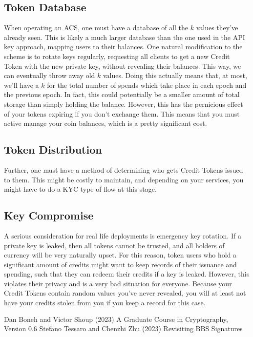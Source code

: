 \documentclass{article}
\begin{document}
\subsection*{Token Database}

When operating an ACS, one must have a database of all the $k$ values they've
already seen. This is likely a much larger database than the one used in the
API key approach, mapping users to their balances. One natural modification to
the scheme is to rotate keys regularly, requesting all clients to get a new
Credit Token with the new private key, without revealing their balances. This
way, we can eventually throw away old $k$ values. Doing this actually means
that, at most, we'll have a $k$ for the total number of spends which take place
in each epoch and the previous epoch. In fact, this could potentially be a
smaller amount of total storage than simply holding the balance. However, this
has the pernicious effect of your tokens expiring if you don't exchange them.
This means that you must active manage your coin balances, which is a pretty
significant cost.

\subsection*{Token Distribution}

Further, one must have a method of determining who gets Credit Tokens issued to
them. This might be costly to maintain, and depending on your services, you
might have to do a KYC type of flow at this stage.

\subsection*{Key Compromise}

A serious consideration for real life deployments is emergency key rotation. If
a private key is leaked, then all tokens cannot be trusted, and all holders of
currency will be very naturally upset. For this reason, token users who hold a
significant amount of credits might want to keep records of their issuance and
spending, such that they can redeem their credits if a key is leaked. However,
this violates their privacy and is a very bad situation for everyone. Because
your Credit Tokens contain random values you've never revealed, you will at
least not have your credits stolen from you if you keep a record for this case.

\begin{thebibliography}{9}
Dan Boneh and Victor Shoup (2023) A Graduate Course in Cryptography, Version 0.6
Stefano Tessaro and Chenzhi Zhu (2023) Revisiting BBS Signatures
\end{thebibliography}
\end{document}
